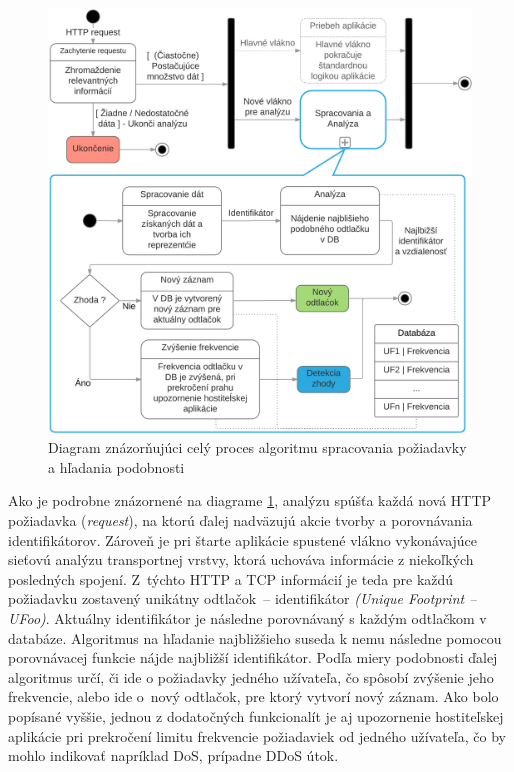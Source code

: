 \documentclass[
  printed, %
  table,   %
  lof,     %
  nolot,   %
  nocover
]{fithesis3}
\begin{document}
\begin{figure}[h]
  \centering
    \includegraphics[width=.93\textwidth]{images/footprint-hl.png}
  \caption{Diagram znázorňujúci celý proces algoritmu spracovania požiadavky a
  hľadania podobnosti}
  \label{fig:footprint-hl}
\end{figure}

Ako je podrobne znázornené na diagrame \ref{fig:footprint-hl}, analýzu spúšťa každá nová
HTTP požiadavka (\textit{request}), na ktorú ďalej nadväzujú akcie tvorby a porovnávania
identifikátorov. Zároveň je pri štarte aplikácie spustené vlákno vykonávajúce
sieťovú analýzu transportnej vrstvy, ktorá uchováva informácie z niekoľkých
posledných spojení. Z~týchto HTTP a TCP informácií je teda pre každú požiadavku
zostavený unikátny odtlačok~-- identifikátor \textit{(Unique Footprint -- UFoo)}.
Aktuálny identifikátor je následne porovnávaný s každým odtlačkom v databáze.
Algoritmus na hľadanie najbližšieho suseda k nemu následne pomocou porovnávacej
funkcie nájde najbližší identifikátor. Podľa miery podobnosti ďalej
algoritmus určí, či ide o požiadavky jedného užívateľa, čo spôsobí zvýšenie jeho
frekvencie, alebo ide o~nový odtlačok, pre ktorý vytvorí nový záznam.
Ako bolo popísané vyššie, jednou z dodatočných funkcionalít je aj upozornenie hostiteľskej aplikácie pri
prekročení limitu frekvencie požiadaviek od jedného užívateľa, čo by mohlo
indikovať napríklad DoS, prípadne DDoS útok.
\end{document}
